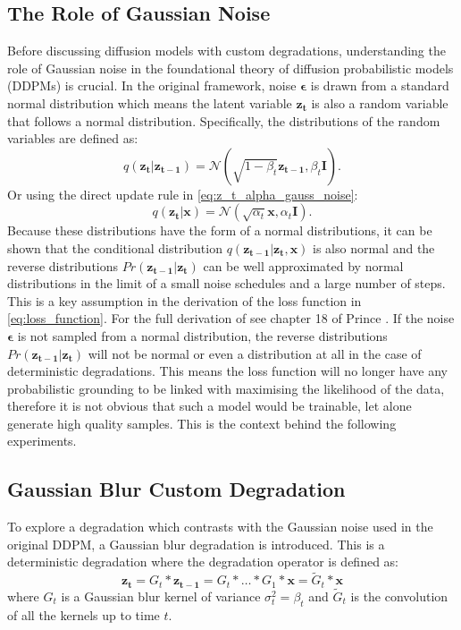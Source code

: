 \documentclass[11pt]{article}
\begin{document}
\subsection{The Role of Gaussian Noise}
Before discussing diffusion models with custom degradations, understanding the role of Gaussian noise in the foundational theory of diffusion probabilistic models (DDPMs) is crucial. In the original framework, noise $\boldsymbol{\epsilon}$ is drawn from a standard normal distribution which means the latent variable $\mathbf{z_t}$ is also a random variable that follows a normal distribution. Specifically, the distributions of the random variables are defined as:
$$
q(\mathbf{z_t}|\mathbf{z_{t-1}}) = \mathcal{N}(\sqrt{1-\beta_t}\mathbf{z_{t-1}}, \beta_t \mathbf{I}).
$$
Or using the direct update rule in \ref{eq:z_t_alpha_gauss_noise}:
$$
q(\mathbf{z_t}|\mathbf{x}) = \mathcal{N}(\sqrt{\alpha_t}\mathbf{x}, \alpha_t\mathbf{I}).
$$
Because these distributions have the form of a normal distributions, it can be shown that the conditional distribution $q(\mathbf{z_{t-1}}|\mathbf{z_t}, \mathbf{x})$ is also normal and the reverse distributions $Pr(\mathbf{z_{t-1}}|\mathbf{z_t})$ can be well approximated by normal distributions in the limit of a small noise schedules and a large number of steps. This is a key assumption in the derivation of the loss function in \ref{eq:loss_function}. For the full derivation of see chapter 18 of Prince \cite{prince}. If the noise $\boldsymbol{\epsilon}$ is not sampled from a normal distribution, the reverse distributions $Pr(\mathbf{z_{t-1}}|\mathbf{z_t})$ will not be normal or even a distribution at all in the case of deterministic degradations. This means the loss function will no longer have any probabilistic grounding to be linked with maximising the likelihood of the data, therefore it is not obvious that such a model would be trainable, let alone generate high quality samples. This is the context behind the following experiments.

\subsection{Gaussian Blur Custom Degradation}
To explore a degradation which contrasts with the Gaussian noise used in the original DDPM, a Gaussian blur degradation is introduced. This is a deterministic
degradation where the degradation operator is defined as:
\begin{equation}
    \mathbf{z_t} = G_t * \mathbf{z_{t-1}} = G_t * \dots * G_1 * \mathbf{x} = \tilde{G}_t * \mathbf{x}
\end{equation}
where $G_t$ is a Gaussian blur kernel of variance $\sigma_t^2 = \beta_t$ and $\tilde{G}_t$ is the convolution of all the kernels up to time $t$.
\end{document}
